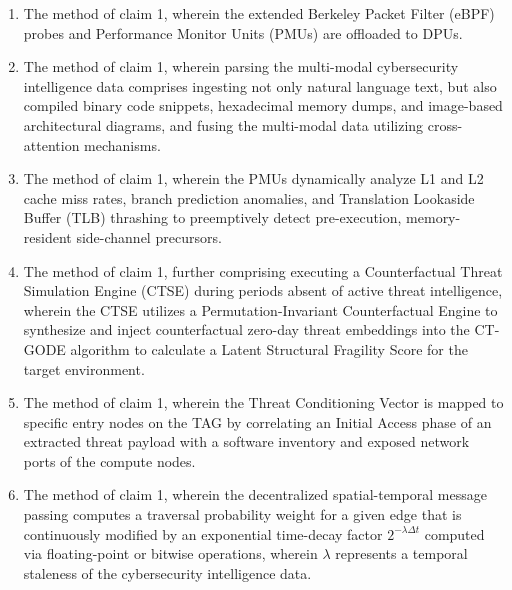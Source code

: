 \documentclass[12pt, letterpaper]{article}
\begin{document}
\begin{enumerate}[label=\textbf{\arabic*.}, leftmargin=*]
    \item The method of claim 1, wherein the extended Berkeley Packet Filter (eBPF) probes and Performance Monitor Units (PMUs) are offloaded to DPUs.

    \item The method of claim 1, wherein parsing the multi-modal cybersecurity intelligence data comprises ingesting not only natural language text, but also compiled binary code snippets, hexadecimal memory dumps, and image-based architectural diagrams, and fusing the multi-modal data utilizing cross-attention mechanisms.

    \item The method of claim 1, wherein the PMUs dynamically analyze L1 and L2 cache miss rates, branch prediction anomalies, and Translation Lookaside Buffer (TLB) thrashing to preemptively detect pre-execution, memory-resident side-channel precursors.

    \item The method of claim 1, further comprising executing a Counterfactual Threat Simulation Engine (CTSE) during periods absent of active threat intelligence, wherein the CTSE utilizes a Permutation-Invariant Counterfactual Engine to synthesize and inject counterfactual zero-day threat embeddings into the CT-GODE algorithm to calculate a Latent Structural Fragility Score for the target environment.

    \item The method of claim 1, wherein the Threat Conditioning Vector is mapped to specific entry nodes on the TAG by correlating an Initial Access phase of an extracted threat payload with a software inventory and exposed network ports of the compute nodes.

    \item The method of claim 1, wherein the decentralized spatial-temporal message passing computes a traversal probability weight for a given edge that is continuously modified by an exponential time-decay factor $2^{-\lambda \Delta t}$ computed via floating-point or bitwise operations, wherein $\lambda$ represents a temporal staleness of the cybersecurity intelligence data.


\end{enumerate}
\end{document}
